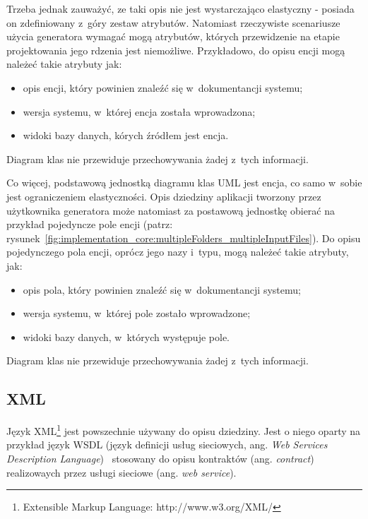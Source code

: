 

Trzeba jednak zauważyć, ze taki opis nie jest wystarczająco elastyczny - posiada on zdefiniowany z~góry zestaw atrybutów.
Natomiast rzeczywiste scenariusze użycia generatora wymagać mogą atrybutów, których przewidzenie na etapie projektowania jego rdzenia jest niemożliwe.
Przykładowo, do opisu encji mogą należeć takie atrybuty jak:

\begin{itemize}
 \item opis encji, który powinien znaleźć się w~dokumentancji systemu;
 \item wersja systemu, w~której encja została wprowadzona;
 \item widoki bazy danych, kórych źródłem jest encja.
\end{itemize}

Diagram klas nie przewiduje przechowywania żadej z~tych informacji.

Co więcej, podstawową jednostką diagramu klas UML jest encja, co samo w~sobie jest ograniczeniem elastyczności.
Opis dziedziny aplikacji tworzony przez użytkownika generatora może natomiast za postawową jednostkę obierać na przykład pojedyncze pole encji (patrz: rysunek~\ref{fig:implementation_core:multipleFolders_multipleInputFiles}).
Do opisu pojedynczego pola encji, oprócz jego nazy i~typu, mogą należeć takie atrybuty, jak:

\begin{itemize}
 \item opis pola, który powinien znaleźć się w~dokumentancji systemu;
 \item wersja systemu, w~której pole zostało wprowadzone;
 \item widoki bazy danych, w~których występuje pole.
\end{itemize}

Diagram klas nie przewiduje przechowywania żadej z~tych informacji.


\subsection{XML}

Język XML\footnote{Extensible Markup Language: http://www.w3.org/XML/} jest powszechnie używany do opisu dziedziny.
Jest o niego oparty na przykład język WSDL (język definicji usług sieciowych, ang. \emph{Web Services Description Language})~\cite{wsdl} stosowany do opisu kontraktów (ang. \emph{contract}) realizowaych przez usługi sieciowe (ang. \emph{web service}).

